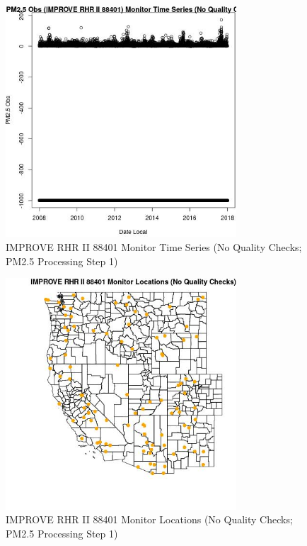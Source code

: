 
\begin{figure} 
\centering  
\includegraphics[width=0.77\textwidth]{Code_Outputs/PM25Source6TSstep1_PM25_ObsvDate_Local.jpg} 
\caption{\label{fig:PM25Source6TSstep1PM25_ObsvDate_Local}IMPROVE RHR II 88401 Monitor Time Series (No Quality Checks; PM2.5 Processing Step 1)} 
\end{figure} 
 

\begin{figure} 
\centering  
\includegraphics[width=0.77\textwidth]{Code_Outputs/PM25Source6TSstep1_MapIMPRHRII88401Locations.jpg} 
\caption{\label{fig:PM25Source6TSstep1MapIMPRHRII88401Locations}IMPROVE RHR II 88401 Monitor Locations (No Quality Checks; PM2.5 Processing Step 1)} 
\end{figure} 
 
